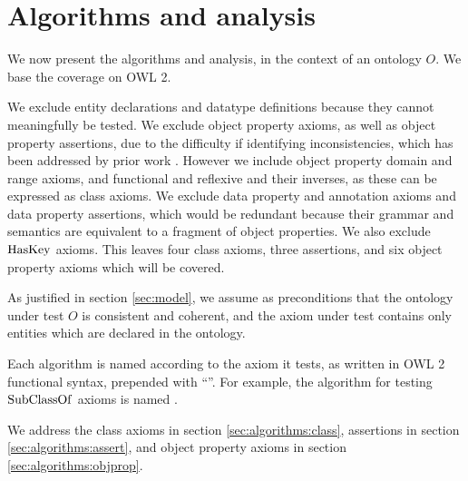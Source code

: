 \documentclass[paper.tex]{subfiles}
\begin{document}
\section{Algorithms and analysis}
\label{sec:algorithms}

We now present the algorithms and analysis, in the context of an ontology $O$.
We base the coverage on OWL 2.

We exclude entity declarations and datatype definitions because they cannot meaningfully be tested.
We exclude object property axioms, as well as object property assertions, due to the difficulty if identifying inconsistencies, which has been addressed by prior work \cite{Keet:ObjProp}.
However we include object property domain and range axioms, and functional and reflexive and their inverses, as these can be expressed as class axioms.
We exclude data property and annotation axioms and data property assertions, which would be redundant because their grammar and semantics are equivalent to a fragment of object properties.
We also exclude $\mathrm{HasKey}$ axioms.
This leaves four class axioms, three assertions, and six object property axioms which will be covered.

As justified in section \ref{sec:model}, we assume as preconditions that the ontology under test $O$ is consistent and coherent, and the axiom under test contains only entities which are declared in the ontology.

Each algorithm is named according to the axiom it tests, as written in OWL 2 functional syntax, prepended with ``''.  For example, the algorithm for testing $\mathrm{SubClassOf}$ axioms is named .

We address the class axioms in section \ref{sec:algorithms:class}, assertions in section \ref{sec:algorithms:assert}, and object property axioms in section \ref{sec:algorithms:objprop}.




\end{document}
